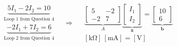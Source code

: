 \documentclass[border=10pt]{standalone}
\begin{document}
\color{equationink}
\begin{minipage}{16cm}
\centering
\Large
\[
\begin{gathered}
\underbrace{5I_1-2I_2=10}_{\text{Loop 1 from Question 4}}\\[0.35cm]
\underbrace{-2I_1+7I_2=6}_{\text{Loop 2 from Question 4}}
\end{gathered}
\quad\Longrightarrow\quad
\begin{gathered}
\underbrace{\begin{bmatrix}5&-2\\-2&7\end{bmatrix}}_{A}
\underbrace{\begin{bmatrix}I_1\\I_2\end{bmatrix}}_{\mathbf{x}}
=
\underbrace{\begin{bmatrix}10\\6\end{bmatrix}}_{\mathbf{b}}\\[0.35cm]
[\mathrm{k\Omega}]\,[\mathrm{mA}]=[\mathrm{V}]
\end{gathered}
\]
\end{minipage}
\end{document}
